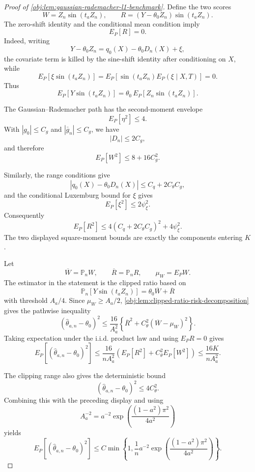 \begin{proof}[Proof of \cref{obj:lem:gaussian-rademacher-l1-benchmark}]
Define the two scores
\[
W=Z_n\sin(t_aZ_n),
\qquad
R=(Y-\theta_0Z_n)\sin(t_aZ_n).
\]
The zero-shift identity and the conditional mean condition imply
\[
E_P[R]=0.
\]
Indeed, writing
\[
Y-\theta_0Z_n
=
q_0(X)-\theta_0D_n(X)+\xi,
\]
the covariate term is killed by the sine-shift identity after conditioning on \(X\), while
\[
E_P[\xi\sin(t_aZ_n)]
=
E_P\!\left[\sin(t_aZ_n)E_P(\xi\mid X,T)\right]
=
0 .
\]
Thus
\[
E_P[Y\sin(t_aZ_n)]
=
\theta_0\,E_P[Z_n\sin(t_aZ_n)] .
\]

The Gaussian--Rademacher path has the second-moment envelope
\[
E_P[\eta^2]\le4.
\]
With \(|g_0|\le C_g\) and \(|\bar g_n|\le C_g\), we have
\[
|D_n|\le2C_g,
\]
and therefore
\[
E_P[W^2]\le 8+16C_g^2.
\]

Similarly, the range conditions give
\[
|q_0(X)-\theta_0D_n(X)|
\le
C_q+2C_\theta C_g,
\]
and the conditional Luxemburg bound for \(\xi\) gives
\[
E_P[\xi^2]\le 2\psi_\xi^2.
\]
Consequently
\[
E_P[R^2]
\le
4(C_q+2C_\theta C_g)^2+4\psi_\xi^2.
\]
The two displayed square-moment bounds are exactly the components entering \(K\). %

Let
\[
\overline W=\mathbb P_n W,
\qquad
\overline R=\mathbb P_n R,
\qquad
\mu_W=E_PW .
\]
The estimator in the statement is the clipped ratio based on
\[
\mathbb P_n[Y\sin(t_aZ_n)]
=
\theta_0\overline W+\overline R
\]
with threshold \(A_a/4\).  Since \(\mu_W\ge A_a/2\), \cref{obj:lem:clipped-ratio-risk-decomposition} gives the pathwise inequality
\[
(\widehat\theta_{a,n}-\theta_0)^2
\le
\frac{16}{A_a^2}
\left\{\overline R^2+C_\theta^2(\overline W-\mu_W)^2\right\}.
\]
Taking expectation under the i.i.d. product law and using \(E_PR=0\) gives
\[
E_P[(\widehat\theta_{a,n}-\theta_0)^2]
\le
\frac{16}{nA_a^2}
\left(E_P[R^2]+C_\theta^2E_P[W^2]\right)
\le
\frac{16K}{nA_a^2}.
\]

The clipping range also gives the deterministic bound
\[
(\widehat\theta_{a,n}-\theta_0)^2\le4C_\theta^2 .
\]
Combining this with the preceding display and using
\[
A_a^{-2}
=
a^{-2}
\exp\!\left(\frac{(1-a^2)\pi^2}{4a^2}\right)
\]
yields
\[
E_P[(\widehat\theta_{a,n}-\theta_0)^2]
\le
C\min\!\left\{
1,\frac1n a^{-2}
\exp\!\left(\frac{(1-a^2)\pi^2}{4a^2}\right)
\right\}.
\]


\end{proof}
